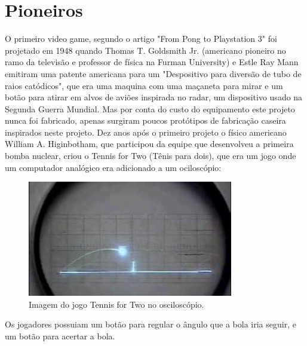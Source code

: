 \documentclass[12pt]{article}
\begin{document}
\section{Pioneiros}
 O primeiro video game, segundo o artigo "From Pong to Playstation 3" \cite{pong-play} foi projetado em 1948 quando Thomas T. Goldsmith Jr. (americano pioneiro no ramo da televis\~{a}o e professor de física na Furman University) e Estle Ray Mann emitiram uma patente americana para um "Despositivo para divers\~{a}o de tubo de raios catódicos", que era uma maquina com uma maçaneta para mirar e um bot\~{a}o para atirar em alvos de avi\~{o}es inspirada no radar, um dispositivo usado na Segunda Guerra Mundial. Mas por conta do custo do equipamento este projeto nunca foi fabricado, apenas surgiram poucos protótipos de fabricaç\~{a}o caseira inspirados neste projeto.
 Dez anos após o primeiro projeto o físico americano William A. Higinbotham, que participou da equipe que desenvolveu a primeira bomba nuclear, criou o Tennis for Two (Tênis para dois), que era um jogo onde um computador analógico era adicionado a um ociloscópio:
\linebreak
\begin{figure}[!htb]
    \centering
    \includegraphics[width=0.8\textwidth]{osciloscopio.jpg}
    \caption{Imagem do jogo Tennis for Two no osciloscópio.}
    \label{fig:osciloscopio}
\end{figure}
\linebreak
 Os jogadores possuiam um bot\~{a}o para regular o ângulo que a bola iria seguir, e um bot\~{a}o para acertar a bola.
 
\end{document}
